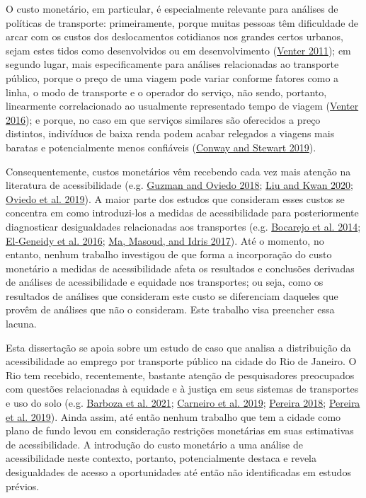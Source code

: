 \documentclass[msc,numbers]{coppe}
\begin{document}
  O custo monetário, em particular, é especialmente relevante para análises de políticas de transporte: primeiramente, porque muitas pessoas têm dificuldade de arcar com os custos dos deslocamentos cotidianos nos grandes certos urbanos, sejam estes tidos como desenvolvidos ou em desenvolvimento (\protect\hyperlink{ref-venter2011transport}{Venter 2011}); em segundo lugar, mais especificamente para análises relacionadas ao transporte público, porque o preço de uma viagem pode variar conforme fatores como a linha, o modo de transporte e o operador do serviço, não sendo, portanto, linearmente correlacionado ao usualmente representado tempo de viagem (\protect\hyperlink{ref-venter2016assessing}{Venter 2016}); e porque, no caso em que serviços similares são oferecidos a preço distintos, indivíduos de baixa renda podem acabar relegados a viagens mais baratas e potencialmente menos confiáveis (\protect\hyperlink{ref-conway2019getting}{Conway and Stewart 2019}).

  Consequentemente, custos monetários vêm recebendo cada vez mais atenção na literatura de acessibilidade (e.g. \protect\hyperlink{ref-guzman2018accessibility}{Guzman and Oviedo 2018}; \protect\hyperlink{ref-liu2020measuring}{Liu and Kwan 2020}; \protect\hyperlink{ref-oviedo2019bus}{Oviedo et al. 2019}). A maior parte dos estudos que consideram esses custos se concentra em como introduzi-los a medidas de acessibilidade para posteriormente diagnosticar desigualdades relacionadas aos transportes (e.g. \protect\hyperlink{ref-bocarejo2014innovative}{Bocarejo et al. 2014}; \protect\hyperlink{ref-el-geneidy2016cost}{El-Geneidy et al. 2016}; \protect\hyperlink{ref-ma2017modeling}{Ma, Masoud, and Idris 2017}). Até o momento, no entanto, nenhum trabalho investigou de que forma a incorporação do custo monetário a medidas de acessibilidade afeta os resultados e conclusões derivadas de análises de acessibilidade e equidade nos transportes; ou seja, como os resultados de análises que consideram este custo se diferenciam daqueles que provêm de análises que não o consideram. Este trabalho visa preencher essa lacuna.

  Esta dissertação se apoia sobre um estudo de caso que analisa a distribuição da acessibilidade ao emprego por transporte público na cidade do Rio de Janeiro. O Rio tem recebido, recentemente, bastante atenção de pesquisadores preocupados com questões relacionadas à equidade e à justiça em seus sistemas de transportes e uso do solo (e.g. \protect\hyperlink{ref-barboza2021balancing}{Barboza et al. 2021}; \protect\hyperlink{ref-carneiro2019espraiamento}{Carneiro et al. 2019}; \protect\hyperlink{ref-pereira2018transport}{Pereira 2018}; \protect\hyperlink{ref-pereira2019distributional}{Pereira et al. 2019}). Ainda assim, até então nenhum trabalho que tem a cidade como plano de fundo levou em consideração restrições monetárias em suas estimativas de acessibilidade. A introdução do custo monetário a uma análise de acessibilidade neste contexto, portanto, potencialmente destaca e revela desigualdades de acesso a oportunidades até então não identificadas em estudos prévios.
\end{document}
